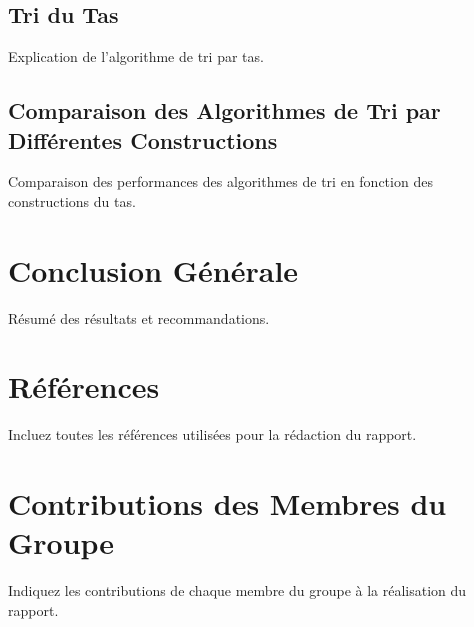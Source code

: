 \documentclass[a4paper, 12pt]{article}
\begin{document}
\subsection{Tri du Tas}
Explication de l'algorithme de tri par tas.

\subsection{Comparaison des Algorithmes de Tri par Différentes Constructions}
Comparaison des performances des algorithmes de tri en fonction des constructions du tas.

\section{Conclusion Générale}
Résumé des résultats et recommandations.

\section{Références}
Incluez toutes les références utilisées pour la rédaction du rapport.

\section{Contributions des Membres du Groupe}
Indiquez les contributions de chaque membre du groupe à la réalisation du rapport.
\end{document}
